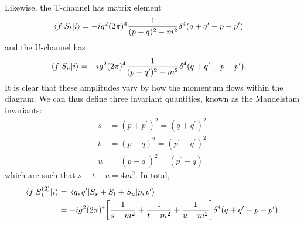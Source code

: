 \documentclass[notes.tex]{subfiles}
\begin{document}
Likewise, the T-channel has matrix element
\begin{align*}
	\mel{f}{S_t}{i} &= -ig^2(2\pi)^4\frac{1}{(p-q)^2 - m^2} \delta^4(q+q^\prime - p - p^\prime)
\end{align*}
and the U-channel has
\begin{align*}
	\mel{f}{S_u}{i} &= -ig^2(2\pi)^4\frac{1}{(p-q^\prime)^2 - m^2} \delta^4(q+q^\prime - p - p^\prime).
\end{align*}
It is clear that these amplitudes vary by how the momentum flows within the diagram. 
We can thus define three invariant quantities, known as the Mandelstam invariants:
\begin{align*}
	s &= (p+p^\prime)^2 = (q+q^\prime)^2\\
	t &= (p-q)^2 = (p^\prime - q^\prime)^2\\
	u &= (p-q^\prime)^2 = (p^\prime-q) 
\end{align*}
which are such that $s+t+u=4m^2$.
In total,
\begin{align*}
	\mel{f}{S_1^{(2)}}{i} &= \mel{q, q^\prime}{S_s + S_t + S_u}{p, p^\prime}\\
	&= -ig^2(2\pi)^4\qty[\frac{1}{s - m^2} + \frac{1}{t - m^2} + \frac{1}{u - m^2}] \delta^4(q + q^\prime - p - p^\prime).
\end{align*}
\end{document}
